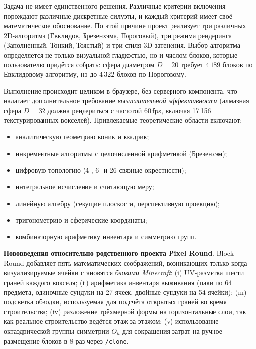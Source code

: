 \documentclass[12pt,a4paper]{scrartcl}
\newcommand{\cmd}[1]{\textcolor{earth}{\texttt{\small #1}}}
\begin{document}
Задача не имеет единственного решения. Различные критерии включения порождают различные дискретные силуэты, и каждый критерий имеет своё математическое обоснование. По этой причине проект реализует три различных 2D-алгоритма (Евклидов, Брезенхэма, Пороговый), три режима рендеринга (Заполненный, Тонкий, Толстый) и три стиля 3D-затенения. Выбор алгоритма определяется не только визуальной гладкостью, но и числом блоков, которые пользователю придётся собрать: сфера диаметром $D=20$ требует $4\,189$ блоков по Евклидовому алгоритму, но до $4\,322$ блоков по Пороговому.

Выполнение происходит целиком в браузере, без серверного компонента, что налагает дополнительное требование \emph{вычислительной эффективности} (алмазная сфера $D=32$ должна рендериться с частотой 60\,fps, включая 17\,156 текстурированных вокселей). Привлекаемые теоретические области включают:
\begin{itemize}[leftmargin=1.3em,itemsep=0.15em,topsep=0.3em]
  \item аналитическую геометрию коник и квадрик;
  \item инкрементные алгоритмы с целочисленной арифметикой (Брезенхэм);
  \item цифровую топологию (4-, 6- и 26-связные окрестности);
  \item интегральное исчисление и считающую меру;
  \item линейную алгебру (секущие плоскости, перспективную проекцию);
  \item тригонометрию и сферические координаты;
  \item комбинаторную арифметику инвентаря и симметрию групп.
\end{itemize}

\textbf{Нововведения относительно родственного проекта Pixel Round.} Block Round добавляет пять математических соображений, возникающих только когда визуализируемые ячейки становятся \emph{блоками Minecraft}: (i) UV-разметка шести граней каждого вокселя; (ii) арифметика инвентаря выживания (паки по 64 предмета, одиночные сундуки на 27 ячеек, двойные сундуки на 54 ячейки); (iii) подсветка обводки, используемая для подсчёта открытых граней во время строительства; (iv) разложение трёхмерной формы на горизонтальные слои, так как реальное строительство ведётся этаж за этажом; (v) использование октаэдрической группы симметрии $O_h$ для сокращения затрат на ручное размещение блоков в $8$ раз через \cmd{/clone}.

\end{document}
